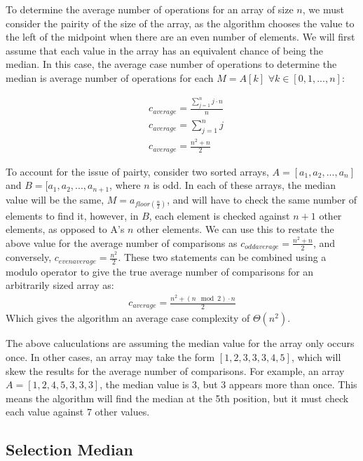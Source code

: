 \documentclass{article}
\begin{document}
            To determine the average number of operations for an array of size $n$, we must consider the pairity of the size of the array, as the algorithm chooses the value to the left of the midpoint when there are an even number of elements. We will first assume that each value in the array has an equivalent chance of being the median. In this case, the average case number of operations to determine the median is average number of operations for each $M = A[k]$ $\forall k \in [0, 1, ..., n]$:

            \begin{align}
                & c_{average} = \frac{\sum_{j = 1}^{n} j \cdot n}{n} \\
                & c_{average} = \sum_{j = 1}^n j\\
                & c_{average} = \frac{n^2 + n}{2}
            \end{align}

            To account for the issue of pairty, consider two sorted arrays, $A = [a_1, a_2, ..., a_n]$ and $B = [a_1, a_2, ..., a_{n+1}$, where $n$ is odd. In each of these arrays, the median value will be the same, $M = a_{floor(\frac{n}{2})}$, and will have to check the same number of elements to find it, however, in $B$, each element is checked against $n + 1$ other elements, as opposed to A's $n$ other elements. We can use this to restate the above value for the average number of comparisons as $c_{odd average} = \frac{n^2 + n}{2}$, and conversely, $c_{even average} = \frac{n^2}{2}$. These two statements can be combined using a modulo operator to give the true average number of comparisons for an arbitrarily sized array as:
            \begin{align}
                c_{average} = \frac{n^2 + (n\mod 2) \cdot n}{2}
            \end{align}
            Which gives the algorithm an average case complexity of $\Theta(n^2)$.

            The above caluculations are assuming the median value for the array only occurs once. In other cases, an array may take the form $[1, 2, 3, 3, 3, 4, 5]$, which will skew the results for the average number of comparisons. For example, an array $A = [1, 2, 4, 5, 3, 3, 3]$, the median value is 3, but 3 appears more than once. This means the algorithm will find the median at the 5th position, but it must check each value against 7 other values.

    \subsection{Selection Median}
\end{document}
